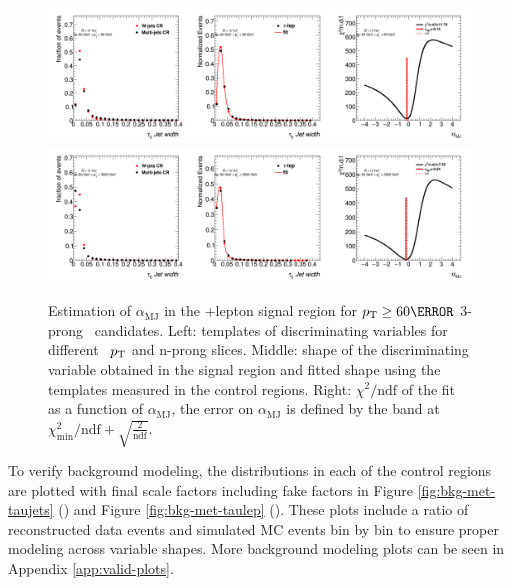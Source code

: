 		\begin{figure}
		\begin{center}
		\includegraphics[width=1\textwidth]{chapters/chapter6_HPlus/images/FFs/FFs_FIT_SR_TAULEP_3_60_80.png}
		\includegraphics[width=1\textwidth]{chapters/chapter6_HPlus/images/FFs/FFs_FIT_SR_TAULEP_3_80_3500.png}
		\end{center}
		\caption{
		Estimation of $\alpha_\mathrm{MJ}$ in the \tauhad+lepton signal region for $\pt \geq 60 \GeV$
		3-prong \tauhad\ candidates. Left: templates of discriminating variables for different \tauhad\ $p_{\text{T}}$
		and n-prong slices. Middle: shape of the discriminating variable obtained in the signal region and fitted
		shape using the templates measured in the control regions. Right: $\chi^2/\mathrm{ndf}$ of the fit as a
		function of $\alpha_\mathrm{MJ}$, the error on $\alpha_\mathrm{MJ}$ is defined by the band at
		$\chi^2_\mathrm{min}/\mathrm{ndf}+\sqrt{\frac{2}{\mathrm{ndf}}}$.
		}
		\label{fig:mm:Fits:region7_4}
		\end{figure}

		\clearpage


		To verify background modeling, the \Etm distributions in each of the control regions are plotted with final scale factors including fake factors in Figure \ref{fig:bkg-met-taujets} (\taujets) and Figure \ref{fig:bkg-met-taulep} (\taulep). These plots include a ratio of reconstructed data events and simulated MC events bin by bin to ensure proper modeling across variable shapes. More background modeling plots can be seen in Appendix \ref{app:valid-plots}.

